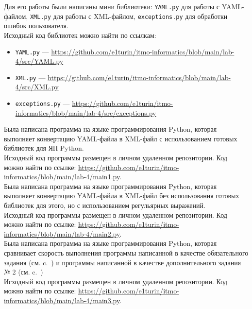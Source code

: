 Для его работы были написаны мини библиотеки: \texttt{YAML.py} для работы с YAML-файлом, \texttt{XML.py} для работы с XML-файлом, \texttt{exсeptions.py} для обработки ошибок пользователя.\\
Исходный код библиотек можно найти по ссылкам: 
\begin{itemize}
    \item \texttt{YAML.py} ---  \url{https://github.com/e1turin/itmo-informatics/blob/main/lab-4/src/YAML.py}
    
    \item \texttt{XML.py} --- \url{https://github.com/e1turin/itmo-informatics/blob/main/lab-4/src/XML.py}
    
    \item \texttt{exсeptions.py} --- \url{https://github.com/e1turin/itmo-informatics/blob/main/lab-4/src/exceptions.py}
\end{itemize}


\label{main1}
Была написана программа на языке программирования Python, которая выполняет конвертацию YAML-файла в XML-файл с использованием готовых библиотек для ЯП Python.\\

Исходный код программы размещен в личном удаленном репозитории. Код можно найти по ссылке: \url{https://github.com/e1turin/itmo-informatics/blob/main/lab-4/main1.py}.\\ 

\label{main2}
Была написана программа на языке программирования Python, которая выполняет конвертацию YAML-файла в XML-файл без использования готовых библиотек для этого, но с использованием регульярных выражений.\\

Исходный код программы размещен в личном удаленном репозитории. Код можно найти по ссылке: \url{https://github.com/e1turin/itmo-informatics/blob/main/lab-4/main2.py}.\\ 
\label{main3}
Была написана программа на языке программирования Python, которая сравнивает скорость выполнения программы написанной в качестве обязательного задания (см. c.~\pageref{main}) и программы написанной в качестве дополнительного задания № 2 (см. c.~\pageref{main2})\\

Исходный код программы размещен в личном удаленном репозитории. Код можно найти по ссылке: \url{https://github.com/e1turin/itmo-informatics/blob/main/lab-4/main3.py}.\\ 


